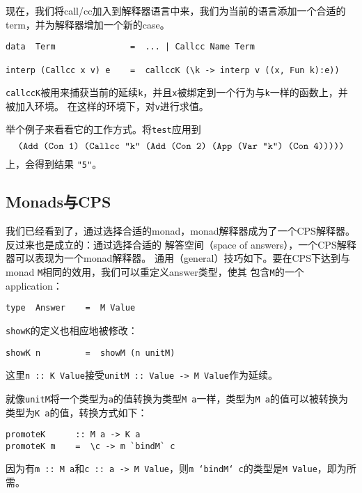 \documentclass[12pt]{article}
\begin{document}
\indent{}现在，我们将call/cc加入到解释器语言中来，我们为当前的语言添加一个合适的term，并为解释器增加一个新的case。
\begin{verbatim}
data  Term               =  ... | Callcc Name Term

interp (Callcc x v) e    =  callccK (\k -> interp v ((x, Fun k):e))
\end{verbatim}
\noindent{}\texttt{callccK}被用来捕获当前的延续\texttt{k}，并且\texttt{x}被绑定到一个行为与\texttt{k}一样的函数上，并被加入环境。
在这样的环境下，对\texttt{v}进行求值。

\indent{}举个例子来看看它的工作方式。将\texttt{test}应用到
\begin{displaymath}
\textrm{\texttt{(Add (Con 1) (Callcc "k" (Add (Con 2) (App (Var "k") (Con 4)))))}}
\end{displaymath}
上，会得到结果 \texttt{"5"}。

\subsection{Monads与CPS}
\indent{}我们已经看到了，通过选择合适的monad，monad解释器成为了一个CPS解释器。反过来也是成立的：通过选择合适的
解答空间（space of answers），一个CPS解释器可以表现为一个monad解释器。
通用（general）技巧如下。要在CPS下达到与monad \texttt{M}相同的效用，我们可以重定义answer类型，使其
包含\texttt{M}的一个application：
\begin{verbatim}
type  Answer    =  M Value
\end{verbatim}
\noindent{}\texttt{showK}的定义也相应地被修改：
\begin{verbatim}
showK n         =  showM (n unitM)
\end{verbatim}
\noindent{}这里\texttt{n :: K Value}接受\texttt{unitM :: Value -> M Value}作为延续。

\indent{}就像\texttt{unitM}将一个类型为\texttt{a}的值转换为类型\texttt{M a}一样，类型为\texttt{M a}的值可以被转换为
类型为\texttt{K a}的值，转换方式如下：
\begin{verbatim}
promoteK      :: M a -> K a
promoteK m    =  \c -> m `bindM` c
\end{verbatim}
\noindent{}因为有\texttt{m :: M a}和\texttt{c :: a -> M Value}，则\texttt{m `bindM` c}的类型是\texttt{M Value}，即为所需。
\end{document}
